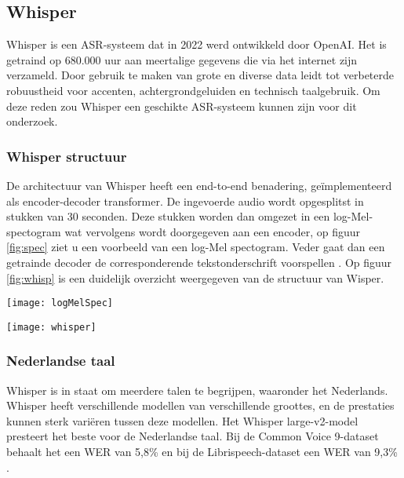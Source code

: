 \subsection{Whisper}
Whisper is een ASR-systeem dat in 2022 werd ontwikkeld door OpenAI.
Het is getraind op 680.000 uur aan meertalige gegevens die via het internet zijn verzameld. Door gebruik te maken van grote en diverse data leidt tot verbeterde robuustheid voor accenten, achtergrondgeluiden en technisch taalgebruik\autocite{OpenAI2022}. Om deze reden zou Whisper een geschikte ASR-systeem kunnen zijn voor dit onderzoek.

\subsubsection{Whisper structuur}
De architectuur van Whisper heeft een end-to-end benadering, geïmplementeerd als encoder-decoder transformer. De ingevoerde audio wordt opgesplitst in stukken van 30 seconden. Deze stukken worden dan omgezet in een log-Mel-spectogram wat vervolgens wordt doorgegeven aan een encoder, op figuur \ref{fig:spec} ziet u een voorbeeld van een log-Mel spectogram. Veder gaat dan een getrainde decoder de corresponderende tekstonderschrift voorspellen \autocite{OpenAI2022}. Op figuur \ref{fig:whisp} is een duidelijk overzicht weergegeven van de structuur van Wisper.
\begin{center}
    \texttt{[image: logMelSpec]}
    \label{fig:spec}
\end{center}
\begin{center}
    \texttt{[image: whisper]}
    \label{fig:whisp}
\end{center}

\subsubsection{Nederlandse taal}
Whisper is in staat om meerdere talen te begrijpen, waaronder het Nederlands. Whisper heeft verschillende modellen van verschillende groottes, en de prestaties kunnen sterk variëren tussen deze modellen. Het Whisper large-v2-model presteert het beste voor de Nederlandse taal. Bij de Common Voice 9-dataset behaalt het een WER van 5,8\% en bij de Librispeech-dataset een WER van 9,3\% \autocite{Tjandra2020}.

